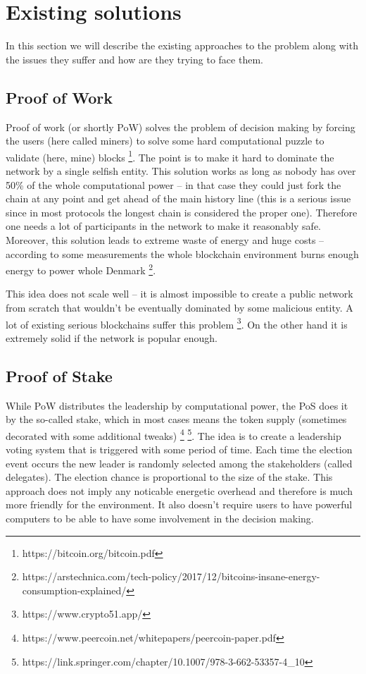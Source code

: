 \section{Existing solutions}

In this section we will describe the existing approaches to the problem along
with the issues they suffer and how are they trying to face them.

\subsection{Proof of Work}

Proof of work (or shortly PoW) solves the problem of decision making by forcing the
users (here called miners) to solve some hard computational puzzle to validate
(here, mine) blocks \footnote{https://bitcoin.org/bitcoin.pdf}.
The point is to make it hard to dominate the network by a
single selfish entity. This solution works as long as nobody has over 50\% of the whole
computational power – in that case they could just fork the chain at any point
and get ahead of the main history line (this is a serious issue since in most
protocols the longest chain is considered the proper one). Therefore one needs a
lot of participants in the network to make it reasonably safe. Moreover, this
solution leads to extreme waste of energy and huge costs – according to some
measurements the whole blockchain environment burns enough energy to power
whole Denmark
\footnote{https://arstechnica.com/tech-policy/2017/12/bitcoins-insane-energy-consumption-explained/}.

This idea does not scale well – it is almost impossible to create a public
network from scratch that wouldn't be eventually dominated by some malicious
entity. A lot of existing serious blockchains suffer this problem
\footnote{https://www.crypto51.app/}. On the other hand it is extremely solid if
the network is popular enough.

\subsection{Proof of Stake}

While PoW distributes the leadership by computational power, the PoS does it by
the so-called stake, which in most cases means the token supply (sometimes decorated
with some additional tweaks)
\footnote{https://www.peercoin.net/whitepapers/peercoin-paper.pdf}
\footnote{https://link.springer.com/chapter/10.1007/978-3-662-53357-4\_10}.
The idea is to create a leadership voting system
that is triggered with some period of time. Each time the election event occurs
the new leader is randomly selected among the stakeholders (called delegates).
The election chance is proportional to the size of the stake. This approach does
not imply any noticable energetic overhead and therefore is much more friendly for the
environment. It also doesn't require users to have powerful computers to be able to
have some involvement in the decision making.

